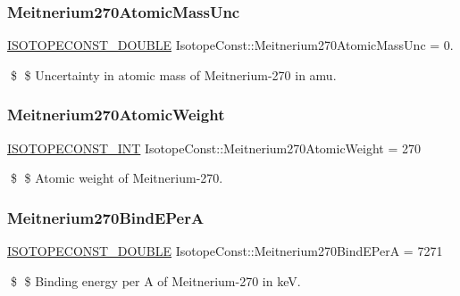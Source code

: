 \subsubsection{\texorpdfstring{Meitnerium270\+Atomic\+Mass\+Unc}{Meitnerium270AtomicMassUnc}}
{\footnotesize\ttfamily \mbox{\hyperlink{group___isotope_const-_macros_ga8f45a7272ce02c0b4c65c44636ed719a}{I\+S\+O\+T\+O\+P\+E\+C\+O\+N\+S\+T\+\_\+\+D\+O\+U\+B\+LE}} Isotope\+Const\+::\+Meitnerium270\+Atomic\+Mass\+Unc = 0.}

\$ \$ Uncertainty in atomic mass of Meitnerium-\/270 in amu. \mbox{\label{group___isotope_const-_meitnerium-_mt270_ga891b261bf8420c5a92dcd90ed9d96e06}} 
\subsubsection{\texorpdfstring{Meitnerium270\+Atomic\+Weight}{Meitnerium270AtomicWeight}}
{\footnotesize\ttfamily \mbox{\hyperlink{group___isotope_const-_macros_ga5f18360b3e99483a35c32d789e62621c}{I\+S\+O\+T\+O\+P\+E\+C\+O\+N\+S\+T\+\_\+\+I\+NT}} Isotope\+Const\+::\+Meitnerium270\+Atomic\+Weight = 270}

\$ \$ Atomic weight of Meitnerium-\/270. \mbox{\label{group___isotope_const-_meitnerium-_mt270_gae2f5ac1313985aa0eb3b9eb6f4ffef88}} 
\subsubsection{\texorpdfstring{Meitnerium270\+Bind\+E\+PerA}{Meitnerium270BindEPerA}}
{\footnotesize\ttfamily \mbox{\hyperlink{group___isotope_const-_macros_ga8f45a7272ce02c0b4c65c44636ed719a}{I\+S\+O\+T\+O\+P\+E\+C\+O\+N\+S\+T\+\_\+\+D\+O\+U\+B\+LE}} Isotope\+Const\+::\+Meitnerium270\+Bind\+E\+PerA = 7271}

\$ \$ Binding energy per A of Meitnerium-\/270 in keV. \mbox{\label{group___isotope_const-_meitnerium-_mt270_gaf1ec3ca1e42ed515106a4fd3f2b2a40c}} 

